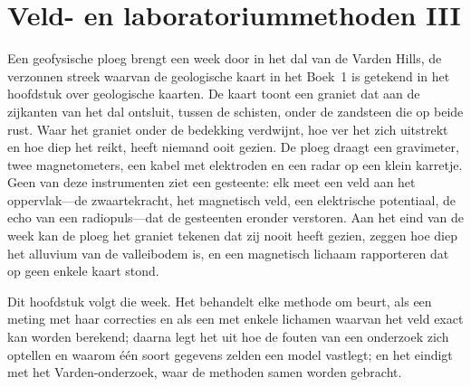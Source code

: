 \chapter{Veld- en laboratoriummethoden III}\label{ch:b3:field-lab-methods-3}

Een geofysische ploeg brengt een week door in het dal van de Varden Hills, de
verzonnen streek waarvan de geologische kaart in het Boek~1 is getekend in
het hoofdstuk over geologische kaarten. De kaart toont een graniet dat aan de
zijkanten van het dal ontsluit, tussen de schisten, onder de zandsteen die op
beide rust. Waar het graniet onder de bedekking verdwijnt, hoe ver het
zich uitstrekt en hoe diep het reikt, heeft niemand ooit gezien. De ploeg draagt een
gravimeter, twee magnetometers, een kabel met elektroden en een radar op
een klein karretje. Geen van deze instrumenten ziet een gesteente: elk meet
een veld aan het oppervlak---de zwaartekracht, het magnetisch veld, een elektrische
potentiaal, de echo van een radiopuls---dat de gesteenten eronder verstoren.
Aan het eind van de week kan de ploeg het graniet tekenen dat zij nooit heeft gezien, zeggen
hoe diep het alluvium van de valleibodem is, en een magnetisch lichaam rapporteren
dat op geen enkele kaart stond.

Dit hoofdstuk volgt die week. Het behandelt elke methode om beurt, als een
meting met haar correcties en als een  met enkele
lichamen waarvan het veld exact kan worden berekend; daarna legt het uit hoe de
fouten van een onderzoek zich optellen en waarom één soort gegevens zelden een
model vastlegt; en het eindigt met het Varden-onderzoek, waar de methoden samen
worden gebracht.

